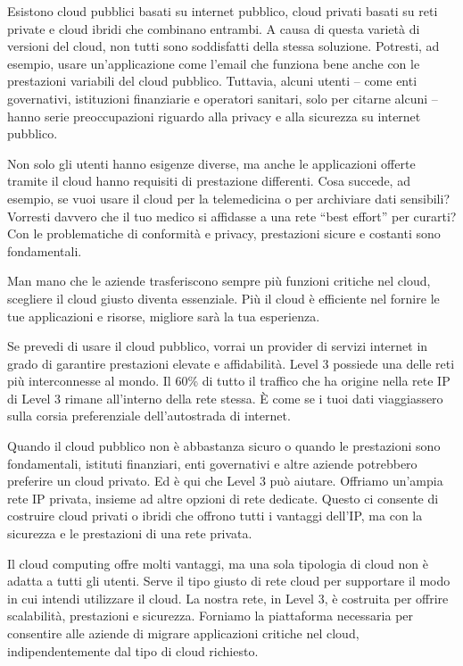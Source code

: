 Esistono cloud pubblici basati su internet pubblico, cloud privati basati su reti private e cloud ibridi che combinano entrambi. A causa di questa varietà di versioni del cloud, non tutti sono soddisfatti della stessa soluzione. Potresti, ad esempio, usare un’applicazione come l’email che funziona bene anche con le prestazioni variabili del cloud pubblico. Tuttavia, alcuni utenti – come enti governativi, istituzioni finanziarie e operatori sanitari, solo per citarne alcuni – hanno serie preoccupazioni riguardo alla privacy e alla sicurezza su internet pubblico.

Non solo gli utenti hanno esigenze diverse, ma anche le applicazioni offerte tramite il cloud hanno requisiti di prestazione differenti. Cosa succede, ad esempio, se vuoi usare il cloud per la telemedicina o per archiviare dati sensibili? Vorresti davvero che il tuo medico si affidasse a una rete “best effort” per curarti? Con le problematiche di conformità e privacy, prestazioni sicure e costanti sono fondamentali.

Man mano che le aziende trasferiscono sempre più funzioni critiche nel cloud, scegliere il cloud giusto diventa essenziale. Più il cloud è efficiente nel fornire le tue applicazioni e risorse, migliore sarà la tua esperienza.

Se prevedi di usare il cloud pubblico, vorrai un provider di servizi internet in grado di garantire prestazioni elevate e affidabilità. Level 3 possiede una delle reti più interconnesse al mondo. Il 60\% di tutto il traffico che ha origine nella rete IP di Level 3 rimane all’interno della rete stessa. È come se i tuoi dati viaggiassero sulla corsia preferenziale dell’autostrada di internet.

Quando il cloud pubblico non è abbastanza sicuro o quando le prestazioni sono fondamentali, istituti finanziari, enti governativi e altre aziende potrebbero preferire un cloud privato. Ed è qui che Level 3 può aiutare. Offriamo un’ampia rete IP privata, insieme ad altre opzioni di rete dedicate. Questo ci consente di costruire cloud privati o ibridi che offrono tutti i vantaggi dell’IP, ma con la sicurezza e le prestazioni di una rete privata.

Il cloud computing offre molti vantaggi, ma una sola tipologia di cloud non è adatta a tutti gli utenti. Serve il tipo giusto di rete cloud per supportare il modo in cui intendi utilizzare il cloud. La nostra rete, in Level 3, è costruita per offrire scalabilità, prestazioni e sicurezza. Forniamo la piattaforma necessaria per consentire alle aziende di migrare applicazioni critiche nel cloud, indipendentemente dal tipo di cloud richiesto.

